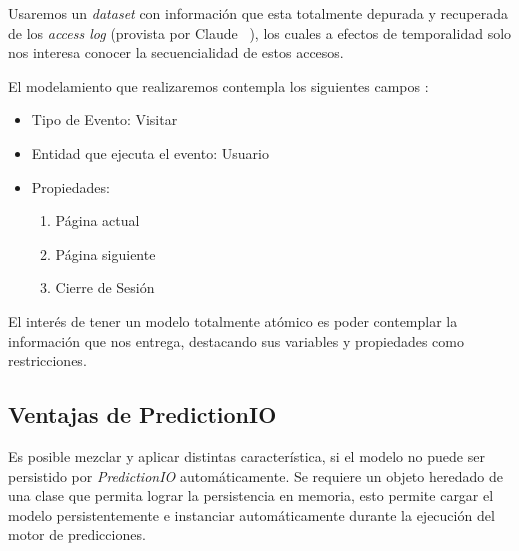   Usaremos un \emph{dataset} con información que esta totalmente depurada y recuperada de los \emph{access log} (provista por Claude \etal~\cite{Claude2014}), los cuales a efectos de temporalidad solo nos interesa conocer la secuencialidad de estos accesos.
  



  El modelamiento que realizaremos contempla los siguientes campos :

    \begin{itemize}
    		\setlength{\itemsep}{1pt}
    		\setlength{\parskip}{0pt}
    		\setlength{\parsep}{0pt}
      \item Tipo de Evento: Visitar
      \item Entidad que ejecuta el evento: Usuario
      \item Propiedades:
          \begin{enumerate}
          		\setlength{\itemsep}{1pt}
          		\setlength{\parskip}{0pt}
          		\setlength{\parsep}{0pt}
            \item Página actual
            \item Página siguiente
            \item Cierre de Sesión
          \end{enumerate}
    \end{itemize}



    El interés de tener un modelo totalmente atómico es poder contemplar la información que nos entrega, destacando sus variables y propiedades como restricciones.



\subsection{Ventajas de PredictionIO }


  Es posible mezclar y aplicar distintas característica, si el modelo no puede ser persistido por \emph{PredictionIO} automáticamente. Se requiere un objeto  heredado de una clase que permita lograr la persistencia en memoria, esto permite cargar el modelo persistentemente e instanciar automáticamente durante la ejecución del motor de predicciones.




